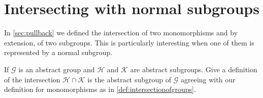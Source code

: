 \section{Intersecting with normal subgroups}
In \cref{sec:pullback} we defined the intersection of two monomorphisms and by extension, of two subgroups.  This is particularly interesting when one of them is represented by a normal subgroup.
\begin{xca}
  If $\mathcal G$ is an abstract group and $\mathcal H$ and $\mathcal K$ are abstract subgroups.  Give a definition of the intersection $\mathcal H\cap\mathcal K$ is the abstract subgroup of $\mathcal G$ agreeing with our definition for monomorphisms as in \cref{def:intersectionofgroups}.
\end{xca}

